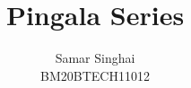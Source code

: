 \documentclass[journal,12pt,twocolumn]{IEEEtran}
\begin{document}
\renewcommand{\thefigure}{\arabic{section}.\arabic{figure}}
\makeatletter
{}
\makeatother


\def\putbox#1#2#3{\makebox[0in][l]{\makebox[#1][l]{}\raisebox{\baselineskip}[0in][0in]{\raisebox{#2}[0in][0in]{#3}}}}
     \def\rightbox#1{\makebox[0in][r]{#1}}
     \def\centbox#1{\makebox[0in]{#1}}
     \def\topbox#1{\raisebox{-\baselineskip}[0in][0in]{#1}}
     \def\midbox#1{\raisebox{-0.5\baselineskip}[0in][0in]{#1}}

\vspace{3cm}

\title{ 
Pingala Series
}


%
%
%

\author{Samar Singhai\\BM20BTECH11012}
% 
%
\end{document}
